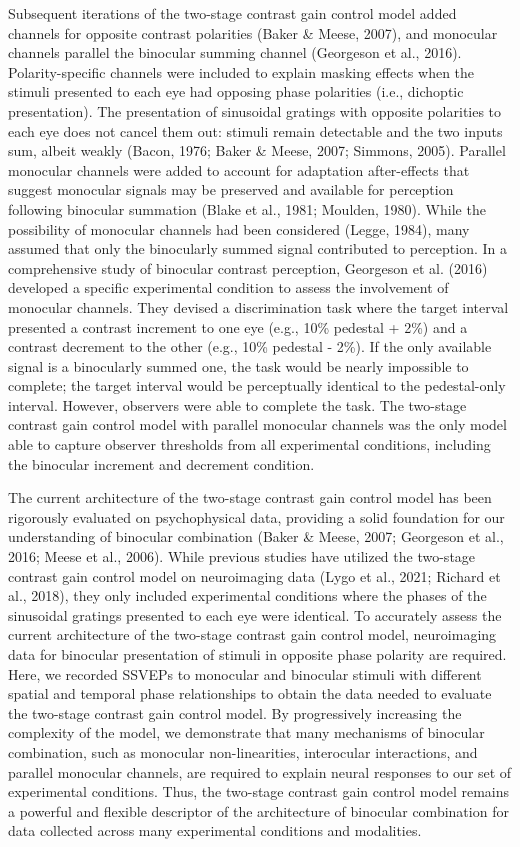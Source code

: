\documentclass[
  12pt,
]{article}
\begin{document}
Subsequent iterations of the two-stage contrast gain control model added
channels for opposite contrast polarities (Baker \& Meese, 2007), and
monocular channels parallel the binocular summing channel (Georgeson et
al., 2016). Polarity-specific channels were included to explain masking
effects when the stimuli presented to each eye had opposing phase
polarities (i.e., dichoptic presentation). The presentation of
sinusoidal gratings with opposite polarities to each eye does not cancel
them out: stimuli remain detectable and the two inputs sum, albeit
weakly (Bacon, 1976; Baker \& Meese, 2007; Simmons, 2005). Parallel
monocular channels were added to account for adaptation after-effects
that suggest monocular signals may be preserved and available for
perception following binocular summation (Blake et al., 1981; Moulden,
1980). While the possibility of monocular channels had been considered
(Legge, 1984), many assumed that only the binocularly summed signal
contributed to perception. In a comprehensive study of binocular
contrast perception, Georgeson et al. (2016) developed a specific
experimental condition to assess the involvement of monocular channels.
They devised a discrimination task where the target interval presented a
contrast increment to one eye (e.g., 10\% pedestal + 2\%) and a contrast
decrement to the other (e.g., 10\% pedestal - 2\%). If the only
available signal is a binocularly summed one, the task would be nearly
impossible to complete; the target interval would be perceptually
identical to the pedestal-only interval. However, observers were able to
complete the task. The two-stage contrast gain control model with
parallel monocular channels was the only model able to capture observer
thresholds from all experimental conditions, including the binocular
increment and decrement condition.

The current architecture of the two-stage contrast gain control model
has been rigorously evaluated on psychophysical data, providing a solid
foundation for our understanding of binocular combination (Baker \&
Meese, 2007; Georgeson et al., 2016; Meese et al., 2006). While previous
studies have utilized the two-stage contrast gain control model on
neuroimaging data (Lygo et al., 2021; Richard et al., 2018), they only
included experimental conditions where the phases of the sinusoidal
gratings presented to each eye were identical. To accurately assess the
current architecture of the two-stage contrast gain control model,
neuroimaging data for binocular presentation of stimuli in opposite
phase polarity are required. Here, we recorded SSVEPs to monocular and
binocular stimuli with different spatial and temporal phase
relationships to obtain the data needed to evaluate the two-stage
contrast gain control model. By progressively increasing the complexity
of the model, we demonstrate that many mechanisms of binocular
combination, such as monocular non-linearities, interocular
interactions, and parallel monocular channels, are required to explain
neural responses to our set of experimental conditions. Thus, the
two-stage contrast gain control model remains a powerful and flexible
descriptor of the architecture of binocular combination for data
collected across many experimental conditions and modalities.
\end{document}
